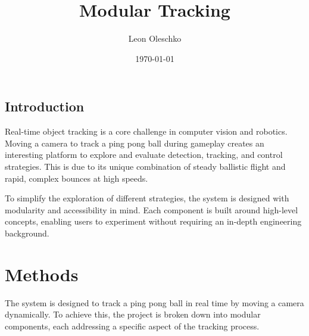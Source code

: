 \documentclass[
    parskip=half, 
    twoside=false,
    twocolumn=true,
    fontsize=12pt,
]{scrarticle}
\begin{document}
\title{Modular Tracking}
\author{Leon Oleschko}
\date{\dotdate\today}

\subsection*{Introduction}
Real-time object tracking is a core challenge in computer vision and robotics. Moving a camera to track a ping pong ball during gameplay creates an interesting platform to explore and evaluate detection, tracking, and control strategies. This is due to its unique combination of steady ballistic flight and rapid, complex bounces at high speeds.

To simplify the exploration of different strategies, the system is designed with modularity and accessibility in mind. Each component is built around high-level concepts, enabling users to experiment without requiring an in-depth engineering background.


\section{Methods}
The system is designed to track a ping pong ball in real time by moving a camera dynamically. To achieve this, the project is broken down into modular components, each addressing a specific aspect of the tracking process. 
\end{document}
